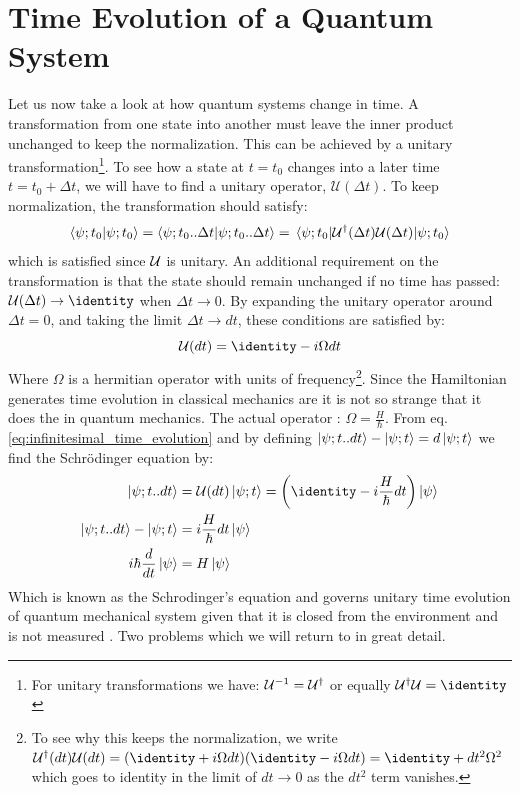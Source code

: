 \section{Time Evolution of a Quantum System}
Let us now take a look at how quantum systems change in time. A transformation from one state into another must leave the inner product unchanged to keep the normalization. This can be achieved by a unitary transformation\footnote{For unitary transformations we have: $\mathcal{U}^{-1} = \mathcal{U}^\dagger$ or equally $\unitary^\dagger\unitary = \identity$}. To see how a state at $t = t_0$ changes into a later time $t = t_0 + \Delta t$, we will have to find a unitary operator, $\mathcal{U}(\Delta t)$. To keep normalization, the transformation should satisfy:
\begin{equation}
    \braket{\psi; t_0}{\psi; t_0} = \braket{\psi; t_0 .. \Delta t}{\psi; t_0 .. \Delta t} = \mel{\psi; t_0}{\mathcal{U}^\dagger (\Delta t) \mathcal{U}(\Delta t)}{\psi; t_0} 
\end{equation}
which is satisfied since $\mathcal{U}$ is unitary. An additional requirement on the transformation is that the state should remain unchanged if no time has passed: $\unitary(\Delta t) \to \identity$ when $\Delta t \to 0$. By expanding the unitary operator around $\Delta t = 0$, and taking the limit $\Delta t \to dt$, these conditions are satisfied by:
\begin{equation}\label{eq:infinitesimal_time_evolution}
    \unitary(dt) = \identity - i \Omega dt
\end{equation}
Where $\Omega$ is a hermitian operator with units of frequency\footnote{To see why this keeps the normalization, we write $\unitary^\dagger(dt)\unitary(dt) = (\identity + i \Omega dt)(\identity - i \Omega dt) = \identity + dt^2 \Omega^2$ which goes to identity in the limit of $dt \to 0$ as the $dt^2$ term vanishes.}. 
Since the Hamiltonian generates time evolution in classical mechanics are it is not so strange that it does the in quantum mechanics. The actual operator : $\Omega = \frac{H}{\hbar}$. From eq. \ref{eq:infinitesimal_time_evolution} and by defining $\ket{\psi; t..dt} - \ket{\psi; t} = d\ket{\psi; t}$ we find the Schrödinger equation by:
\begin{align}
    \ket{\psi; t..dt} &= \unitary(dt) \ket{\psi; t} = \left(\identity - i \frac{H}{\hbar}   dt\right) \ket{\psi} \\
    \ket{\psi; t..dt} - \ket{\psi; t} &= i \frac{H}{\hbar}   dt \ket{\psi} \\
    i \hbar \frac{d}{dt}\ket{\psi} &=  H \ket{\psi}
\end{align}
Which is known as the Schrodinger's equation and governs unitary time evolution of quantum mechanical system given that it is closed from the environment and is not measured \cite{sakurai_modern_2021}. Two problems which we will return to in great detail.

